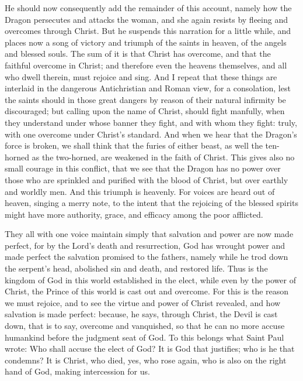 He should now consequently add the remainder of this account, namely how the Dragon persecutes and attacks the woman, and she again resists by fleeing and overcomes through Christ. But he suspends this narration for a little while, and places now a song of victory and triumph of the saints in heaven, of the angels and blessed souls. The sum of it is that Christ has overcome, and that the faithful overcome in Christ; and therefore even the heavens themselves, and all who dwell therein, must rejoice and sing. And I repeat that these things are interlaid in the dangerous Antichristian and Roman view, for a consolation, lest the saints should in those great dangers by reason of their natural infirmity be discouraged; but calling upon the name of Christ, should fight manfully, when they understand under whose banner they fight, and with whom they fight: truly, with one overcome under Christ’s standard. And when we hear that the Dragon’s force is broken, we shall think that the furies of either beast, as well the ten-horned as the two-horned, are weakened in the faith of Christ. This gives also no small courage in this conflict, that we see that the Dragon has no power over those who are sprinkled and purified with the blood of Christ, but over earthly and worldly men. And this triumph is heavenly. For voices are heard out of heaven, singing a merry note, to the intent that the rejoicing of the blessed spirits might have more authority, grace, and efficacy among the poor afflicted.

They all with one voice maintain simply that salvation and power are now made perfect, for by the Lord’s death and resurrection, God has wrought power and made perfect the salvation promised to the fathers, namely while he trod down the serpent’s head, abolished sin and death, and restored life. Thus is the kingdom of God in this world established in the elect, while even by the power of Christ, the Prince of this world is cast out and overcome. For this is the reason we must rejoice, and to see the virtue and power of Christ revealed, and how salvation is made perfect: because, he says, through Christ, the Devil is cast down, that is to say, overcome and vanquished, so that he can no more accuse humankind before the judgment seat of God. To this belongs what Saint Paul wrote: Who shall accuse the elect of God? It is God that justifies; who is he that condemns? It is Christ, who died, yes, who rose again, who is also on the right hand of God, making intercession for us.

